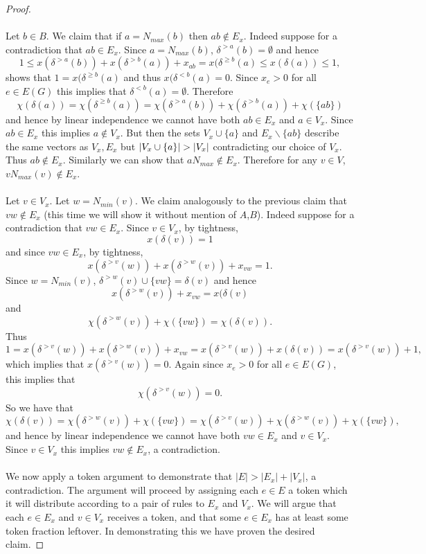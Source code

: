 \begin{proof}
\paragraph{}
Let $b \in B$. We claim that if $a = N_{max}(b)$ then $ab \not\in E_x$. Indeed suppose for a contradiction that $ab \in E_x$. Since $a = N_{max}(b)$, $\delta^{>a}(b) = \emptyset$ and hence
$$1 \leq x(\delta^{>a}(b)) + x(\delta^{>b}(a)) + x_{ab}  = x(\delta^{\geq b}(a) \leq x(\delta(a)) \leq 1,$$
shows that $1 = x(\delta^{\geq b}(a)$ and thus $x(\delta^{<b}(a) = 0$. Since $x_e > 0$ for all $e \in E(G)$ this implies that $\delta^{<b}(a) = \emptyset$. Therefore
$$\chi(\delta(a)) = \chi(\delta^{\geq b}(a)) = \chi(\delta^{>a}(b)) + \chi(\delta^{>b}(a)) + \chi(\{ab\})$$
and hence by linear independence we cannot have both $ab \in E_x$ and $a \in V_x$. Since $ab \in E_x$ this implies $a \not\in V_x$. But then the sets $V_x \cup\{a\}$ and $E_x \backslash\{ab\}$ describe the same vectors as $V_x, E_x$ but $\left|V_x \cup\{a\}\right| > \left|V_x\right|$ contradicting our choice of $V_x$. Thus $ab \not\in E_x$. Similarly we can show that $aN_{max} \not\in E_x$. Therefore for any $v \in V$, $vN_{max}(v) \not\in E_x$.
\paragraph{}
Let $v \in V_x$. Let $w = N_{min}(v)$. We claim analogously to the previous claim that $vw \not\in E_x$ (this time we will show it without mention of $A$,$B$). Indeed suppose for a contradiction that $vw  \in E_x$. Since $v \in V_x$, by tightness,
$$x(\delta(v)) = 1$$
and since $vw \in E_x$, by tightness,
$$x(\delta^{>v}(w)) + x(\delta^{>w}(v)) + x_{vw} = 1.$$
Since $w = N_{min}(v)$, $\delta^{>w}(v) \cup \{vw\} = \delta(v)$ and hence
$$x(\delta^{>w}(v)) + x_{vw} = x(\delta(v)$$
and
$$\chi(\delta^{>w}(v)) + \chi(\{vw\}) = \chi(\delta(v)).$$
Thus
$$1 = x(\delta^{>v}(w)) + x(\delta^{>w}(v)) + x_{vw} = x(\delta^{>v}(w)) + x(\delta(v)) = x(\delta^{>v}(w)) + 1,$$
which implies that $x(\delta^{>v}(w)) = 0$. Again since $x_e > 0$ for all $e \in E(G)$, this implies that
$$\chi(\delta^{>v}(w)) = 0.$$
So we have that
$$\chi(\delta(v)) = \chi(\delta^{>w}(v)) + \chi(\{vw\}) = \chi(\delta^{>v}(w)) + \chi(\delta^{>w}(v)) + \chi(\{vw\}),$$
and hence by linear independence we cannot have both $vw \in E_x$ and $v \in V_x$. Since $v \in V_x$ this implies $vw \not\in E_x$, a contradiction.

\paragraph{}
We now apply a token argument to demonstrate that $|E|> |E_x| + |V_x|$, a contradiction. The argument will proceed by assigning each $e \in E$ a token which it will distribute according to a pair of rules to $E_x$ and $V_x$. We will argue that each $e \in E_x$ and $v \in V_x$ receives a token, and that some $e \in E_x$ has at least some token fraction leftover. In demonstrating this we have proven the desired claim.

\end{proof}
